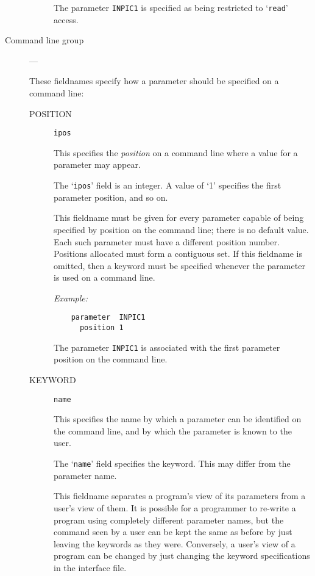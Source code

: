 \begin{description}
\begin{description}
The parameter \verb+INPIC1+ is specified as being restricted to `\verb+read+'
access.

\end{description}

\item [Command line group] ---

These fieldnames specify how a parameter should be specified on a command line:

\begin{description}

\item [POSITION] {\tt ipos}

This specifies the {\em position} on a command line where a value for a
parameter may appear.

The `\verb+ipos+' field is an integer.
A value of `1' specifies the first parameter position, and so on.

This fieldname must be given for every parameter capable of being specified by
position on the command line; there is no default value.
Each such parameter must have a different position number.
Positions allocated must form a contiguous set.
If this fieldname is omitted, then a keyword must be specified whenever the
parameter is used on a command line.

{\em Example:}

\begin{small}
\begin{verbatim}
    parameter  INPIC1
      position 1
\end{verbatim}
\end{small}

The parameter \verb+INPIC1+ is associated with the first parameter position on
the command line.

\item [KEYWORD] {\tt name}

This specifies the name by which a parameter can be identified on the command
line, and by which the parameter is known to the user.

The `\verb+name+' field specifies the keyword.
This may differ from the parameter name.

This fieldname separates a program's view of its parameters from a user's view
of them.
It is possible for a programmer to re-write a program using completely
different parameter names, but the command seen by a user can be kept the same
as before by just leaving the keywords as they were.
Conversely, a user's view of a program can be changed by just changing the
keyword specifications in the interface file.


\end{description}
\end{description}

